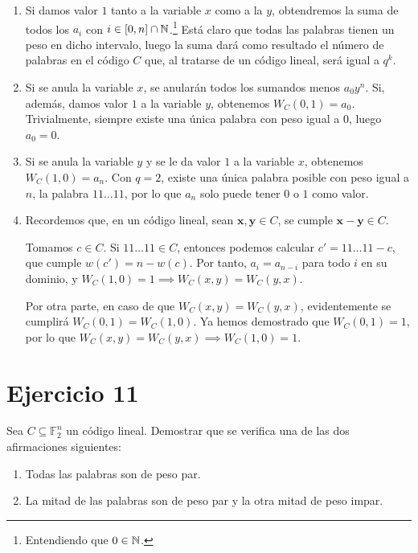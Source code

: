 \begin{enumerate}[label=\alph*)]
	\item Si damos valor $1$ tanto a la variable $x$ como a la $y$, obtendremos la suma de todos los $a_i$ con $i \in [0, n]\cap\mathbb{N}$.\footnote{Entendiendo que $0 \in \mathbb{N}$.} Está claro que todas las palabras tienen un peso en dicho intervalo, luego la suma dará como resultado el número de palabras en el código $C$ que, al tratarse de un código lineal, será igual a $q^k$.
	\item Si se anula la variable $x$, se anularán todos los sumandos menos $a_0y^n$. Si, además, damos valor $1$ a la variable $y$, obtenemos $W_C(0,1) = a_0$. Trivialmente, siempre existe una única palabra con peso igual a $0$, luego $a_0 = 0$.
	\item Si se anula la variable $y$ y se le da valor $1$ a la variable $x$, obtenemos $W_C(1,0) = a_n$. Con $q=2$, existe una única palabra posible con peso igual a $n$, la palabra $11\dots11$, por lo que $a_n$ solo puede tener $0$ o $1$ como valor.
	\item Recordemos que, en un código lineal, sean $\textbf{x}, \textbf{y} \in C$, se cumple $\textbf{x}-\textbf{y} \in C$.
	
	Tomamos $c \in C$. Si $11\dots11 \in C$, entonces podemos calcular $c' = 11\dots11 - c$, que cumple $w(c') = n - w(c)$. Por tanto, $a_i = a_{n-i}$ para todo $i$ en su dominio, y $W_C(1,0) = 1 \implies W_C(x,y) = W_C(y,x)$.
	
	Por otra parte, en caso de que $W_C(x,y) = W_C(y,x)$, evidentemente se cumplirá $W_C(0,1) = W_C(1, 0)$. Ya hemos demostrado que $W_C(0,1) = 1$, por lo que $W_C(x,y) = W_C(y,x) \implies W_C(1,0) = 1$.
\end{enumerate}

\section{Ejercicio 11}

\begin{formulationBox}
	Sea $C \subseteq \mathbb{F}_2^n$ un código lineal. Demostrar que se verifica una de las dos afirmaciones siguientes:
	\begin{enumerate}[label=\alph*)]
		\item Todas las palabras son de peso par.
		\item La mitad de las palabras son de peso par y la otra mitad de peso impar.
	\end{enumerate}
\end{formulationBox}

